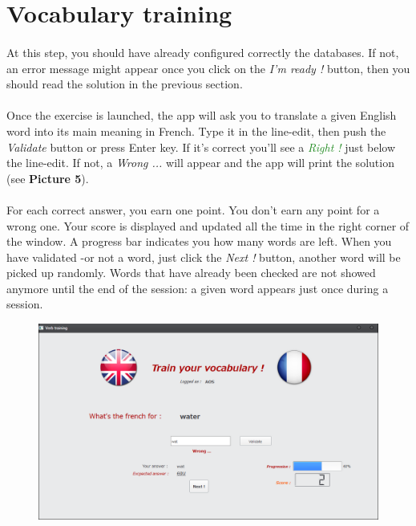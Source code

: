 \documentclass[12pt, a4paper]{report}
\begin{document}
\newpage
\section*{\hspace{0.6cm}Vocabulary training}

\paragraph{}At this step, you should have already configured correctly the databases. If not, an error message might appear once you click on the \textit{I'm ready !} button, then you should read the solution in the previous section.
\paragraph{}Once the exercise is launched, the app will ask you to translate a given English word into its main meaning in French. Type it in the line-edit, then push the \textit{Validate} button or press Enter key. If it's correct you'll see a \textit{\textcolor{ForestGreen}{Right !}} just below the line-edit. If not, a \textit{\textcolor{BrickRed}{Wrong ...}} will appear and the app will print the solution (see \textbf{Picture 5}).

\paragraph{}For each correct answer, you earn one point. You don't earn any point for a wrong one. Your score is displayed and updated all the time in the right corner of the window. A progress bar indicates you how many words are left. When you have validated -or not a word, just click the \textit{Next !} button, another word will be picked up randomly. Words that have already been checked are not showed anymore until the end of the session: a given word appears just once during a session.

\begin{figure}[H]
    \centering
    \includegraphics[scale=0.55]{images/vocab.png}
\end{figure}
\end{document}
